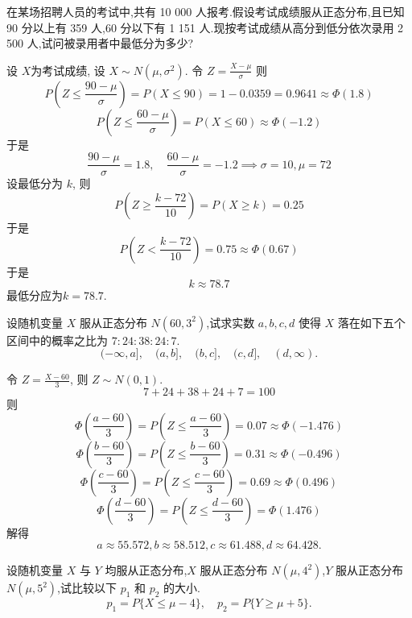 \documentclass[../main.tex]{subfiles}
\begin{document}
\begin{exercise}{}{}
在某场招聘人员的考试中,共有 10 000 人报考.假设考试成绩服从正态分布,且已知 90 分以上有 359 人,60 分以下有 1 151 人.现按考试成绩从高分到低分依次录用 2 500 人,试问被录用者中最低分为多少?
\end{exercise}
\begin{solution}
  设 \(  X  \)为考试成绩,  设 \(  X\sim N\left( \mu , \sigma ^{2} \right)   \). 令 \(  Z= \frac{X-\mu  }{ \sigma  }   \) 则 \[
 P\left( Z\le \frac{90-\mu  }{ \sigma  }  \right)=   P\left( X\le  90 \right)=1- 0.0359= 0.9641\approx \Phi \left( 1.8\right) 
  \]  \[
  P\left( Z\le  \frac{60-\mu  }{ \sigma  }  \right) = P\left( X\le 60 \right)\approx \Phi \left( -1.2 \right) 
  \]于是 \[
  \frac{90-\mu  }{ \sigma  }= 1.8,\quad \frac{60-\mu  }{ \sigma  }= -1.2\implies  \sigma = 10, \mu = 72  
  \] 设最低分为 \(  k  \), 则 \[
 P\left( Z\ge \frac{k-72 }{10 }  \right)=   P\left( X\ge k \right)= 0.25 
  \] 于是 \[
  P\left( Z< \frac{k-72 }{10 }  \right)= 0.75\approx \Phi \left( 0.67 \right) 
  \]于是 \[
  k\approx 78.7
  \]最低分应为\(  k=78.7  \).
\end{solution}

\begin{exercise}{}{}
设随机变量 $X$ 服从正态分布 $N(60,3^2)$,试求实数 $a,b,c,d$ 使得 $X$ 落在如下五个区间中的概率之比为 $7:24:38:24:7$.
$$(-\infty,a], \quad (a,b], \quad (b,c], \quad (c,d], \quad (d,\infty).$$
\end{exercise}
\begin{solution}
   令 \(  Z= \frac{X-60 }{3 }   \), 则 \(  Z\sim N\left( 0,1 \right)   \).  \[
  7+ 24+ 38+ 24+ 7= 100
  \]  则 \[
  \Phi \left( \frac{a-60 }{3 }  \right)=  P\left( Z\le \frac{a-60 }{3 }  \right)= 0.07 \approx \Phi \left( -1.476 \right) 
  \] \[
  \Phi \left( \frac{b-60 }{3 }  \right)= P\left( Z\le \frac{b-60 }{3 }  \right)= 0.31 \approx \Phi \left( -0.496 \right) 
  \] \[
  \Phi \left( \frac{c-60 }{3 }  \right)= P\left( Z\le \frac{c-60 }{3 }  \right)=  0.69\approx \Phi \left( 0.496 \right) 
  \] \[
  \Phi \left( \frac{d-60 }{3 }  \right)= P\left( Z\le \frac{d-60 }{3 }  \right)= \Phi \left( 1.476 \right) 
  \]解得 \[
  a \approx 55.572, b \approx 58.512, c \approx 61.488, d \approx 64.428.
  \]
\end{solution}

\begin{exercise}{}{}
设随机变量 $X$ 与 $Y$ 均服从正态分布,$X$ 服从正态分布 $N(\mu,4^2)$,$Y$ 服从正态分布 $N(\mu,5^2)$,试比较以下 $p_1$ 和 $p_2$ 的大小.
$$p_1 = P\{X \leqslant \mu - 4\}, \quad p_2 = P\{Y \geqslant \mu + 5\}.$$
\end{exercise}
\end{document}
